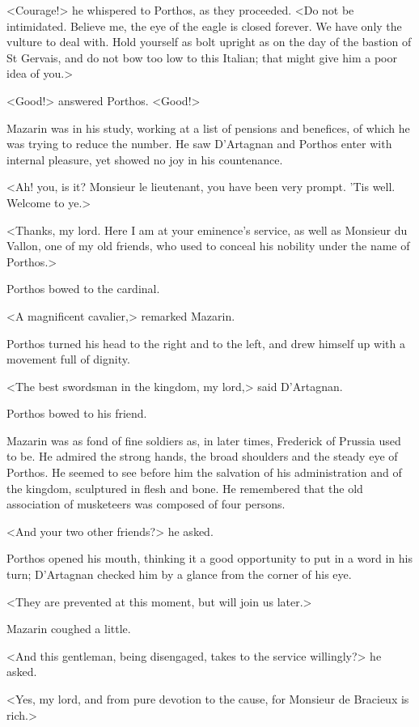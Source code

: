 <Courage!> he whispered to Porthos, as they proceeded. <Do not be intimidated. Believe me, the eye of the eagle is closed forever. We have only the vulture to deal with. Hold yourself as bolt upright as on the day of the bastion of St Gervais, and do not bow too low to this Italian; that might give him a poor idea of you.>

<Good!> answered Porthos. <Good!>

Mazarin was in his study, working at a list of pensions and benefices, of which he was trying to reduce the number. He saw D'Artagnan and Porthos enter with internal pleasure, yet showed no joy in his countenance.

<Ah! you, is it? Monsieur le lieutenant, you have been very prompt. 'Tis well. Welcome to ye.>

<Thanks, my lord. Here I am at your eminence's service, as well as Monsieur du Vallon, one of my old friends, who used to conceal his nobility under the name of Porthos.>

Porthos bowed to the cardinal.

<A magnificent cavalier,> remarked Mazarin.

Porthos turned his head to the right and to the left, and drew himself up with a movement full of dignity.

<The best swordsman in the kingdom, my lord,> said D'Artagnan.

Porthos bowed to his friend.

Mazarin was as fond of fine soldiers as, in later times, Frederick of Prussia used to be. He admired the strong hands, the broad shoulders and the steady eye of Porthos. He seemed to see before him the salvation of his administration and of the kingdom, sculptured in flesh and bone. He remembered that the old association of musketeers was composed of four persons.

<And your two other friends?> he asked.

Porthos opened his mouth, thinking it a good opportunity to put in a word in his turn; D'Artagnan checked him by a glance from the corner of his eye.

<They are prevented at this moment, but will join us later.>

Mazarin coughed a little.

<And this gentleman, being disengaged, takes to the service willingly?> he asked.

<Yes, my lord, and from pure devotion to the cause, for Monsieur de Bracieux is rich.>

